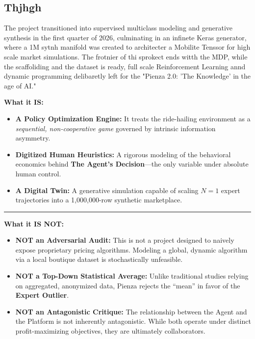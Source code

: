 
\subsection{Thjhgh}
 The project transitioned into supervised multiclass modeling and generative synthesis in the first quarter of 2026, culminating in an infinete Keras generator, where a 1M sytnh manifold was created to architecter a Mobilite Tenssor for high scale market simulations. The frotnier of thi sprokect ends witth the MDP, while the scaffoliding and the dataset is ready, full scale Reinforcement Learning annd dynamic programming delibaretly left for the "Pienza 2.0: 'The Knowledge' in the age of AI." 



\vspace{0.5cm}

\begin{tcolorbox}[colback=white, colframe=black, arc=0mm, title=\sffamily \textbf{THE DEFINITION OF PIENZA}]
    \rmfamily
    \textbf{What it IS:}
    \begin{itemize}[noitemsep, topsep=2pt, leftmargin=1.5em]
        \item \textbf{A Policy Optimization Engine:} It treats the ride-hailing environment as a \textit{sequential, non-cooperative game} governed by intrinsic information asymmetry.
        \item \textbf{Digitized Human Heuristics:} A rigorous modeling of the behavioral economics behind \textbf{The Agent’s Decision}---the only variable under absolute human control.
        \item \textbf{A Digital Twin:} A generative simulation capable of scaling $N=1$ expert trajectories into a 1,000,000-row synthetic marketplace.
    \end{itemize}
    
    \vspace{2mm}
    \hrule
    \vspace{2mm}
    
    \textbf{What it IS NOT:}
    \begin{itemize}[noitemsep, topsep=2pt, leftmargin=1.5em]
        \item \textbf{NOT an Adversarial Audit:} This is not a project designed to naively expose proprietary pricing algorithms. Modeling a global, dynamic algorithm via a local boutique dataset is stochastically unfeasible.
        \item \textbf{NOT a Top-Down Statistical Average:} Unlike traditional studies relying on aggregated, anonymized data, Pienza rejects the ``mean'' in favor of the \textbf{Expert Outlier}.
        \item \textbf{NOT an Antagonistic Critique:} The relationship between the Agent and the Platform is not inherently antagonistic. While both operate under distinct profit-maximizing objectives, they are ultimately collaborators.
    \end{itemize}
\end{tcolorbox}

